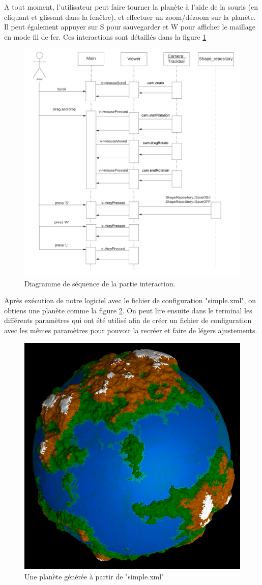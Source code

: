 \documentclass[a4paper]{article}
\begin{document}
\newpage
A tout moment, l'utilisateur peut faire tourner la planète à l'aide de la souris (en cliquant et glissant dans la fenêtre), et effectuer un zoom/dézoom sur la planète. Il peut également appuyer sur S pour sauvegarder et W pour afficher le maillage en mode fil de fer. Ces interactions sont détaillés dans la figure \ref{seqinter} 

\begin{figure}[!h]
    \begin{center}
        \includegraphics[width=0.7\linewidth]{img/interaction_seq.png} 
        \caption{Diagramme de séquence de la partie interaction.}
        \label{seqinter}
    \end{center}
\end{figure}

\newpage
Après exécution de notre logiciel avec le fichier de configuration "simple.xml", on obtiens une planète comme la figure \ref{notre_planete}. On peut lire ensuite dans le terminal les différents paramètres qui ont été utilisé afin de créer un fichier de configuration avec les mêmes paramètres pour pouvoir la recréer et faire de légers ajustements.\\

\begin{figure}[!h]
    \begin{center}
        \includegraphics[width=0.6\linewidth]{img/notre_planete.png} 
        \caption{Une planète générée à partir de "simple.xml"}
        \label{notre_planete}
    \end{center}
\end{figure}
\end{document}
